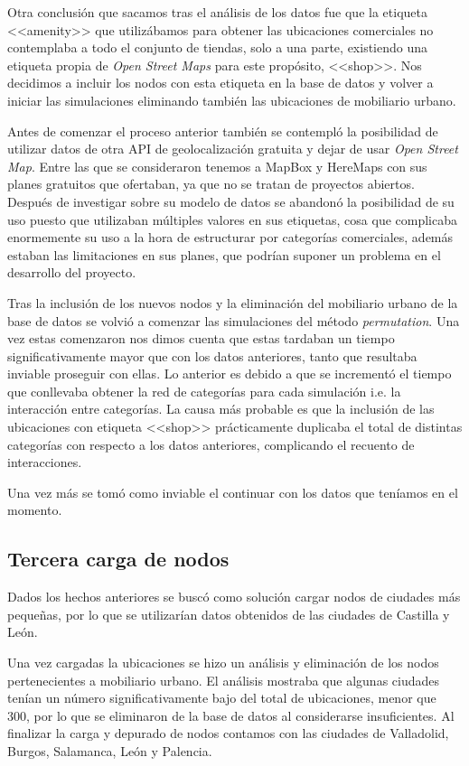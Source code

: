 Otra conclusión que sacamos tras el análisis de los datos fue que la etiqueta <<amenity>> que utilizábamos para obtener las ubicaciones comerciales no contemplaba
a todo el conjunto de tiendas, solo a una parte, existiendo una etiqueta propia de \textit{Open Street Maps} para este propósito, <<shop>>. Nos decidimos a incluir los nodos con esta etiqueta en la base de datos y volver a iniciar las simulaciones eliminando también las ubicaciones de mobiliario urbano.

Antes de comenzar el proceso anterior también se contempló la posibilidad de utilizar datos de otra API de geolocalización gratuita y dejar de usar \textit{Open Street Map}. Entre las que se consideraron tenemos a MapBox y HereMaps con sus planes gratuitos que ofertaban, ya que no se tratan de proyectos abiertos. Después de investigar sobre su modelo de datos se abandonó la posibilidad de su uso puesto que utilizaban múltiples valores en sus etiquetas, cosa que complicaba enormemente su uso a la hora de estructurar por categorías comerciales, además estaban las limitaciones en sus planes, que podrían suponer un problema en el desarrollo del proyecto.

Tras la inclusión de los nuevos nodos y la eliminación del mobiliario urbano de la base de datos se volvió a comenzar las simulaciones del método \textit{permutation}.
Una vez estas comenzaron nos dimos cuenta que estas tardaban un tiempo significativamente mayor que con los datos anteriores, tanto que resultaba inviable proseguir con ellas. Lo anterior es debido a que se incrementó el tiempo que conllevaba obtener la red de categorías para cada simulación i.e. la interacción entre categorías. La causa más probable es que la inclusión de las ubicaciones con etiqueta <<shop>> prácticamente duplicaba el total de distintas categorías con respecto a los datos anteriores, complicando el recuento de interacciones.

Una vez más se tomó como inviable el continuar con los datos que teníamos en el momento.

\subsection{Tercera carga de nodos}
Dados los hechos anteriores se buscó como solución cargar nodos de ciudades más pequeñas, por lo que se utilizarían datos obtenidos de las ciudades de Castilla y León. 

Una vez cargadas la ubicaciones se hizo un análisis y eliminación de los nodos pertenecientes a mobiliario urbano. El análisis mostraba que algunas ciudades tenían un número significativamente bajo del total de ubicaciones, menor que 300, por lo que se eliminaron de la base de datos al considerarse insuficientes. Al finalizar la carga y depurado de nodos contamos con las ciudades de Valladolid, Burgos, Salamanca, León y Palencia.


